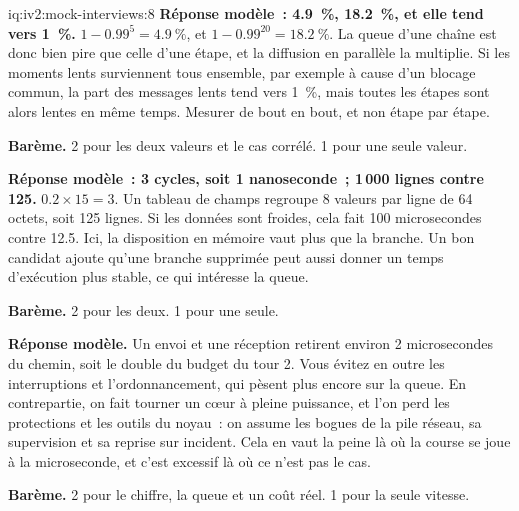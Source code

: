 \begin{solution}{iq:iv2:mock-interviews:8}
\ivstop
\textbf{Réponse modèle~: 4.9~\%, 18.2~\%, et elle tend vers 1~\%.} $1 - 0.99^5 = 4.9~\%$, et $1 - 0.99^{20} = 18.2~\%$. La queue d'une chaîne est donc bien pire que celle d'une étape, et la diffusion en parallèle la multiplie. Si les moments lents surviennent tous ensemble, par exemple à cause d'un blocage commun, la part des messages lents tend vers 1~\%, mais toutes les étapes sont alors lentes en même temps. Mesurer de bout en bout, et non étape par étape.

\textbf{Barème.} 2 pour les deux valeurs et le cas corrélé. 1 pour une seule valeur.

\ivstop
\textbf{Réponse modèle~: 3 cycles, soit 1 nanoseconde~; 1\,000 lignes contre 125.} $0.2 \times 15 = 3$. Un tableau de champs regroupe 8 valeurs par ligne de 64 octets, soit 125 lignes. Si les données sont froides, cela fait 100 microsecondes contre 12.5. Ici, la disposition en mémoire vaut plus que la branche. Un bon candidat ajoute qu'une branche supprimée peut aussi donner un temps d'exécution plus stable, ce qui intéresse la queue.

\textbf{Barème.} 2 pour les deux. 1 pour une seule.

\ivstop
\textbf{Réponse modèle.} Un envoi et une réception retirent environ 2 microsecondes du chemin, soit le double du budget du tour 2. Vous évitez en outre les interruptions et l'ordonnancement, qui pèsent plus encore sur la queue. En contrepartie, on fait tourner un cœur à pleine puissance, et l'on perd les protections et les outils du noyau~: on assume les bogues de la pile réseau, sa supervision et sa reprise sur incident. Cela en vaut la peine là où la course se joue à la microseconde, et c'est excessif là où ce n'est pas le cas.

\textbf{Barème.} 2 pour le chiffre, la queue et un coût réel. 1 pour la seule vitesse.


\end{solution}
